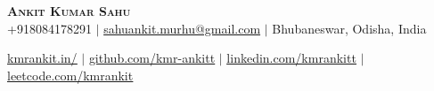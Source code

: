 \begin{center}
  \textbf{\Huge \scshape Ankit Kumar Sahu} \\

  +918084178291 $|$ 
  \small \href{mailto:sahuankit.murhu@gmail.com}{sahuankit.murhu@gmail.com} $|$ 
  Bhubaneswar, Odisha, India \\ \vspace{2pt}
  
  \href{https://www.kmrankit.in/}{\underline{kmrankit.in/}} $|$ 
  \href{https://github.com/kmr-ankitt}{\underline{github.com/kmr-ankitt}} $|$ 
  \href{https://www.linkedin.com/in/kmrankitt/}{\underline{linkedin.com/kmrankitt}} $|$ 
  \href{https://leetcode.com/u/kmrankit/}{\underline{leetcode.com/kmrankit}}
\end{center}
